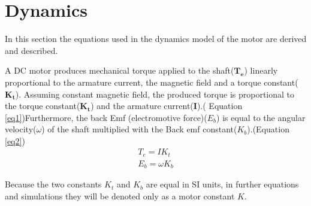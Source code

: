 



\section{Dynamics} \label{dc_math}


In this section the equations used in the dynamics model of the motor are derived and described.

A DC motor produces mechanical torque applied to the shaft($\boldsymbol{T_e}$) linearly proportional to the armature current, the magnetic field and a torque constant($\boldsymbol{K_t}$). Assuming constant magnetic field, the produced torque is proportional to the torque constant($\boldsymbol{K_t}$) and the armature current(\textbf{I}).( Equation \ref{eq1})Furthermore, the back Emf (electromotive force)($E_b$) is equal to the angular velocity($\omega$) of the shaft multiplied with the Back emf constant($K_b$).(Equation \ref{eq2}) \\

\begin{align}  
T_e = IK_t \label{eq8}\\
E_b = \omega K_b \label{eq9}
\end{align}

Because the two constants $K_t$ and $K_b$ are equal in SI units, in further equations and simulations they will be denoted only as a motor constant $K$.



